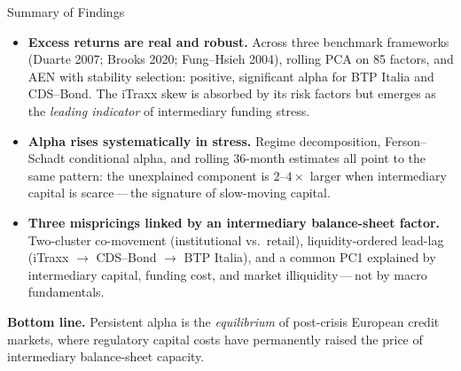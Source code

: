 \documentclass[aspectratio=169,11pt]{beamer}
\newcommand{\hlt}[1]{\textcolor{edhecred}{\textbf{#1}}}     %
\newcommand{\hltb}[1]{\textcolor{accentblue}{\textbf{#1}}}  %
\begin{document}
\begin{frame}[t]{Summary of Findings}
\small
\vspace{0.10cm}

\begin{itemize}\itemsep=0.30cm

  \item \hlt{Excess returns are real and robust.}
  Across three benchmark frameworks (Duarte 2007; Brooks 2020; Fung--Hsieh 2004),
  rolling PCA on 85 factors, and AEN with stability selection: positive,
  significant alpha for BTP Italia and CDS--Bond. The iTraxx skew is absorbed by
  its risk factors but emerges as the \emph{leading indicator} of intermediary
  funding stress.

  \item \hlt{Alpha rises systematically in stress.}
  Regime decomposition, Ferson--Schadt conditional alpha, and rolling 36-month
  estimates all point to the same pattern: the unexplained component is
  $2$--$4 \times$ larger when intermediary capital is scarce\,---\,the
  signature of slow-moving capital.

  \item \hlt{Three mispricings linked by an intermediary balance-sheet factor.}
  Two-cluster co-movement (institutional vs.\ retail), liquidity-ordered lead-lag
  (iTraxx $\to$ CDS--Bond $\to$ BTP Italia), and a common PC1 explained by
  intermediary capital, funding cost, and market illiquidity\,---\,not by macro
  fundamentals.

\end{itemize}

\vspace{0.30cm}

\hltb{Bottom line.} Persistent alpha is the \emph{equilibrium} of post-crisis
European credit markets, where regulatory capital costs have permanently raised
the price of intermediary balance-sheet capacity.

\end{frame}
\end{document}
